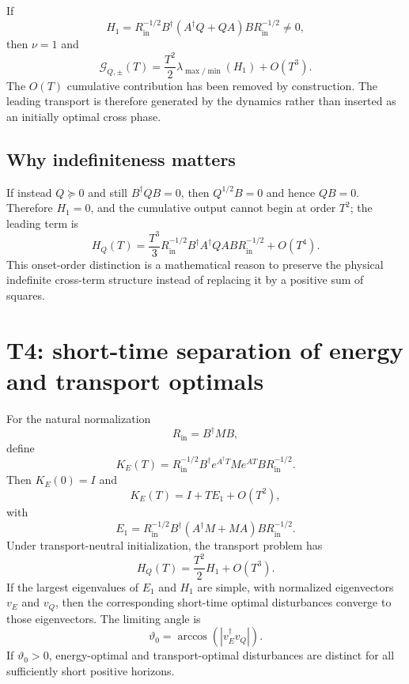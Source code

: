 \documentclass[11pt,a4paper]{article}
\newcommand{\HQ}{H_Q}
\begin{document}
If
\begin{equation}
  H_1
  =R_{\mathrm{in}}^{-1/2}
   B^\dagger(A^\dagger Q+QA)B
   R_{\mathrm{in}}^{-1/2}\neq0,
\end{equation}
then $\nu=1$ and
\begin{equation}
  \mathcal{G}_{Q,\pm}(T)
  =\frac{T^2}{2}\lambda_{\max/\min}(H_1)+O(T^3).
  \label{eq:T1neutral}
\end{equation}
The $O(T)$ cumulative contribution has been removed by construction. The leading transport is therefore generated by the dynamics rather than inserted as an initially optimal cross phase.

\subsection{Why indefiniteness matters}

If instead $Q\succeq0$ and still $B^\dagger QB=0$, then $Q^{1/2}B=0$ and hence $QB=0$. Therefore $H_1=0$, and the cumulative output cannot begin at order $T^2$; the leading term is
\begin{equation}
  \HQ(T)
  =\frac{T^3}{3}
  R_{\mathrm{in}}^{-1/2}
  B^\dagger A^\dagger QAB
  R_{\mathrm{in}}^{-1/2}
  +O(T^4).
\end{equation}
This onset-order distinction is a mathematical reason to preserve the physical indefinite cross-term structure instead of replacing it by a positive sum of squares.

\section{T4: short-time separation of energy and transport optimals}

For the natural normalization
\begin{equation}
  R_{\mathrm{in}}=B^\dagger MB,
\end{equation}
define
\begin{equation}
  K_E(T)
  =R_{\mathrm{in}}^{-1/2}
   B^\dagger e^{A^\dagger T}Me^{AT}B
   R_{\mathrm{in}}^{-1/2}.
\end{equation}
Then $K_E(0)=I$ and
\begin{equation}
  K_E(T)=I+T E_1+O(T^2),
\end{equation}
with
\begin{equation}
  E_1
  =R_{\mathrm{in}}^{-1/2}
   B^\dagger(A^\dagger M+MA)B
   R_{\mathrm{in}}^{-1/2}.
\end{equation}
Under transport-neutral initialization, the transport problem has
\begin{equation}
  \HQ(T)=\frac{T^2}{2}H_1+O(T^3).
\end{equation}
If the largest eigenvalues of $E_1$ and $H_1$ are simple, with normalized eigenvectors $v_E$ and $v_Q$, then the corresponding short-time optimal disturbances converge to those eigenvectors. The limiting angle is
\begin{equation}
  \vartheta_0
  =\arccos\!\left(|v_E^\dagger v_Q|\right).
  \label{eq:angle}
\end{equation}
If $\vartheta_0>0$, energy-optimal and transport-optimal disturbances are distinct for all sufficiently short positive horizons.
\end{document}
